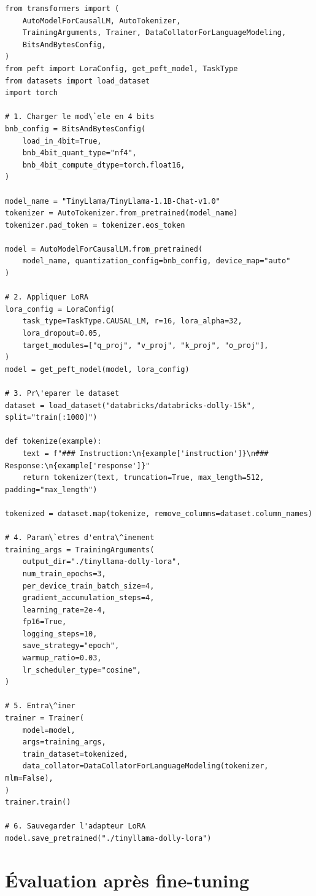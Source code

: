 \begin{verbatim}
from transformers import (
    AutoModelForCausalLM, AutoTokenizer,
    TrainingArguments, Trainer, DataCollatorForLanguageModeling,
    BitsAndBytesConfig,
)
from peft import LoraConfig, get_peft_model, TaskType
from datasets import load_dataset
import torch

# 1. Charger le mod\`ele en 4 bits
bnb_config = BitsAndBytesConfig(
    load_in_4bit=True,
    bnb_4bit_quant_type="nf4",
    bnb_4bit_compute_dtype=torch.float16,
)

model_name = "TinyLlama/TinyLlama-1.1B-Chat-v1.0"
tokenizer = AutoTokenizer.from_pretrained(model_name)
tokenizer.pad_token = tokenizer.eos_token

model = AutoModelForCausalLM.from_pretrained(
    model_name, quantization_config=bnb_config, device_map="auto"
)

# 2. Appliquer LoRA
lora_config = LoraConfig(
    task_type=TaskType.CAUSAL_LM, r=16, lora_alpha=32,
    lora_dropout=0.05,
    target_modules=["q_proj", "v_proj", "k_proj", "o_proj"],
)
model = get_peft_model(model, lora_config)

# 3. Pr\'eparer le dataset
dataset = load_dataset("databricks/databricks-dolly-15k", split="train[:1000]")

def tokenize(example):
    text = f"### Instruction:\n{example['instruction']}\n### Response:\n{example['response']}"
    return tokenizer(text, truncation=True, max_length=512, padding="max_length")

tokenized = dataset.map(tokenize, remove_columns=dataset.column_names)

# 4. Param\`etres d'entra\^inement
training_args = TrainingArguments(
    output_dir="./tinyllama-dolly-lora",
    num_train_epochs=3,
    per_device_train_batch_size=4,
    gradient_accumulation_steps=4,
    learning_rate=2e-4,
    fp16=True,
    logging_steps=10,
    save_strategy="epoch",
    warmup_ratio=0.03,
    lr_scheduler_type="cosine",
)

# 5. Entra\^iner
trainer = Trainer(
    model=model,
    args=training_args,
    train_dataset=tokenized,
    data_collator=DataCollatorForLanguageModeling(tokenizer, mlm=False),
)
trainer.train()

# 6. Sauvegarder l'adapteur LoRA
model.save_pretrained("./tinyllama-dolly-lora")
\end{verbatim}

\section{\'Evaluation apr\`es fine-tuning}

